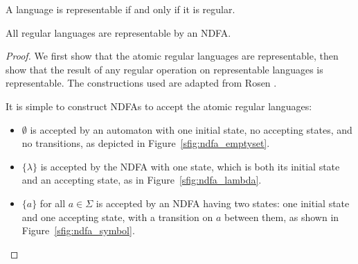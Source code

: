 \documentclass{bcthesis}
\newcommand{\footcite}[2]{\xspace\cite[pg.~{#2}]{#1}\xspace}
\begin{document}
\label{ch:kleenes_theorem}

	\begin{theorem}
		A language is representable if and only if it is regular.
	\end{theorem}

	\begin{claim}
	\label{prop:regular_languages_representable}
		All regular languages are representable by an NDFA.
	\end{claim}
	\begin{proof}
		We first show that the atomic regular languages are representable, then show that the result of any regular operation on representable languages is representable. The constructions used are adapted from Rosen \footcite{rosen}{880--881}.

		It is simple to construct NDFAs to accept the atomic regular languages:
		\begin{itemize}
			\item [] $\emptyset$ is accepted by an automaton with one initial state, no accepting states, and no transitions, as depicted in Figure~\ref{sfig:ndfa_emptyset}.
			\item [] $\{ \lambda \}$ is accepted by the NDFA with one state, which is both its initial state and an accepting state, as in Figure~\ref{sfig:ndfa_lambda}.
			\item [] $\{ a \}$ for all $a \in \Sigma$ is accepted by an NDFA having two states: one initial state and one accepting state, with a transition on $a$ between them, as shown in Figure~\ref{sfig:ndfa_symbol}.
		\end{itemize}



\end{proof}
\end{document}
